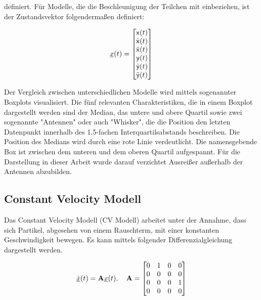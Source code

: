 definiert.
Für Modelle, die die Beschleunigung der Teilchen mit einbeziehen, ist der Zustandsvektor folgendermaßen definiert:

\begin{equation} \label{eq:definitionCA}
    {\underline{x}}(t) = 
    \begin{bmatrix}
        \mathsf{x}(t) \\
        \dot{\mathsf{x}}(t) \\
        \ddot{\mathsf{x}}(t) \\
        \mathsf{y}(t) \\
        \dot{\mathsf{y}}(t) \\
        \ddot{\mathsf{y}}(t)
       \end{bmatrix} 
\end{equation}

Der Vergleich zwischen unterschiedlichen Modelle wird mittels sogenannter Boxplots visualisiert.
Die fünf relevanten Charakteristiken, die in einem Boxplot dargestellt werden sind 
der Median, das untere und obere Quartil sowie zwei sogenannte "Antennen" oder auch "Whisker", die die Position den letzten Datenpunkt innerhalb des 1.5-fachen Interquartilsabstands beschreiben.
Die Position des Medians wird durch eine rote Linie verdeutlicht.
Die namensgebende Box ist zwischen dem unteren und dem oberen Quartil aufgespannt.
Für die Darstellung in dieser Arbeit wurde darauf verzichtet Ausreißer außerhalb der Antennen abzubilden.



\subsection{Constant Velocity Modell}

Das Constant Velocity Modell (CV Modell) arbeitet unter der Annahme, dass sich Partikel, 
abgesehen von einem Rauschterm, mit einer konstanten Geschwindigkeit bewegen.
Es kann mittels folgender Differenzialgleichung dargestellt werden.

\begin{equation*} \label{eq:speedCV}
    \dot{{\underline{x}}}(t) = {{\mathbf{A}}}{\underline{x}}(t), \quad {\ensuremath{{\mathbf{A}}}} = 
    \begin{bmatrix}
        0 & 1 & 0 & 0 \\
        0 & 0 & 0 & 0 \\
        0 & 0 & 0 & 1\\
        0 & 0 & 0 & 0
    \end{bmatrix} 
\end{equation*}

